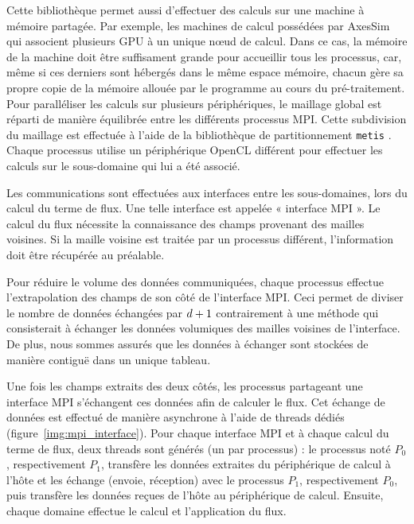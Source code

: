 Cette bibliothèque permet aussi d'effectuer des calculs sur une machine à mémoire
partagée. Par exemple, les machines de calcul possédées par AxesSim qui associent
plusieurs GPU à un unique nœud de calcul.
Dans ce cas, la mémoire de la machine doit être suffisament grande pour accueillir
tous les processus, car, même si ces derniers sont hébergés dans le même espace
mémoire, chacun gère sa propre copie de la mémoire allouée par le programme
au cours du pré-traitement.
\\ 


Pour paralléliser les calculs sur plusieurs périphériques, le maillage global
est réparti de manière équilibrée entre les différents processus MPI.
Cette subdivision du maillage est effectuée à l'aide de la bibliothèque de
partitionnement \texttt{metis} \cite{Karypis:1998:FHQ:305219.305248}.
Chaque processus utilise un périphérique OpenCL différent pour effectuer
les calculs sur le sous-domaine qui lui a été associé.

Les communications sont effectuées aux interfaces entre les sous-domaines, lors
du calcul du terme de flux. Une telle interface est appelée « interface MPI ».
Le calcul du flux nécessite la connaissance des champs
provenant des mailles voisines. Si la maille voisine est traitée par un processus
différent, l'information doit être récupérée au préalable.

Pour réduire le volume des données communiquées, chaque processus
effectue l'extrapolation des champs de son côté de l'interface MPI. Ceci permet
de diviser le nombre de données échangées par $d + 1$ contrairement à
une méthode qui consisterait à échanger les données volumiques des mailles
voisines de l'interface.
De plus, nous sommes assurés que les données à échanger sont stockées de manière
contiguë dans un unique tableau.

Une fois les champs extraits des deux côtés, les processus partageant une
interface MPI s'échangent ces données afin de calculer le flux.
Cet échange de données est effectué de manière asynchrone à l'aide de threads
dédiés (figure~\ref{img:mpi_interface}). Pour chaque interface MPI et à chaque calcul du terme de flux,
deux threads sont générés (un par processus) : le processus noté $P_0$,
respectivement $P_1$,
transfère les données extraites du périphérique de calcul à l’hôte et les échange
(envoie, réception) avec le processus $P_1$, respectivement $P_0$,
puis transfère les données reçues de l’hôte au périphérique de calcul.
Ensuite, chaque domaine effectue le calcul et l'application du flux.


